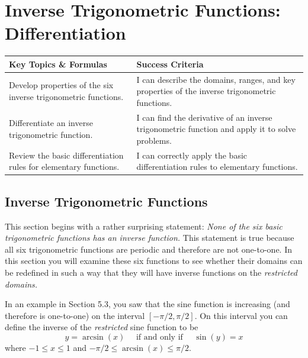 \documentclass[12pt, letterpaper]{article}
\begin{document}
\newpage
\section{Inverse Trigonometric Functions: Differentiation}
\begin{objectives}
    \renewcommand{\arraystretch}{1.5} %
    \begin{tabularx}{\textwidth}{@{} >{\raggedright\arraybackslash}X >{\raggedright\arraybackslash}X @{}}
        
        \textbf{Key Topics \& Formulas} & \textbf{Success Criteria} \\ 
        \midrule[1.5pt] %
        
        Develop properties of the six inverse trigonometric functions.
        & I can describe the domains, ranges, and key properties of the inverse trigonometric functions. \\
        \midrule %
        
        Differentiate an inverse trigonometric function.
        & I can find the derivative of an inverse trigonometric function and apply it to solve problems. \\
        \midrule

        Review the basic differentiation rules for elementary functions.
        & I can correctly apply the basic differentiation rules to elementary functions.
    \end{tabularx}
\end{objectives}

\subsection{Inverse Trigonometric Functions}
This section begins with a rather surprising statement: \textit{None of the six basic trigonometric functions has an inverse function.} This statement is true because all six
trigonometric functions are periodic and therefore are not one-to-one. In this section
you will examine these six functions to see whether their domains can be redefined in
such a way that they will have inverse functions on the \textit{restricted domains.}

In an example in Section 5.3, you saw that the sine function is increasing (and
therefore is one-to-one) on the interval $[-\pi/2, \pi/2]$. On this interval you can define the inverse of the \textit{restricted} sine function to be 
$$y=\arcsin(x) \quad \text{ if and only if } \quad \sin(y)=x$$
where $-1\leq x\leq 1$ and $-\pi/2 \leq \arcsin(x) \leq \pi/2$.
\end{document}
